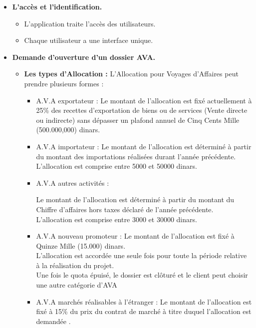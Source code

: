 \begin{itemize}
\item \textbf{L'accès et l'identification.}

\begin{itemize}
\item  L'application traite l'accès des utilisateurs.
\item Chaque utilisateur a une interface unique.
\end{itemize}



\item \textbf{Demande d'ouverture d'un dossier AVA.}

\begin{itemize}
\item \textbf{Les types d'Allocation :}
L'Allocation pour Voyages d'Affaires peut prendre plusieurs formes :

\begin{itemize}
\item A.V.A exportateur : 
Le montant de l'allocation est fixé actuellement à 25\% des recettes d'exportation de biens ou de services (Vente directe ou indirecte)
sans dépasser un plafond annuel de Cinq Cents Mille (500.000,000) dinars.

\item A.V.A importateur :
Le montant de l'allocation est déterminé à partir du montant des importations réalisées durant l'année précédente.\\
L'allocation est comprise entre 5000 et 50000 dinars.

\item A.V.A autres activités :

Le montant de l'allocation est déterminé à partir du montant du Chiffre d'affaires hors taxes déclaré de l'année précédente.\\
L'allocation est comprise entre 3000 et 30000 dinars.

\item A.V.A nouveau promoteur :
Le montant de l'allocation est fixé à Quinze Mille (15.000) dinars.\\
L'allocation est accordée une seule fois pour toute la période relative à la réalisation du projet.\\
Une fois le quota épuisé, le dossier est clôturé et le client peut choisir une autre catégorie d'AVA

\item A.V.A marchés réalisables à l'étranger :
Le montant de l'allocation est fixé à 15\% du prix du contrat de marché à titre duquel l'allocation est demandée .


\end{itemize}
\end{itemize}
\end{itemize}
